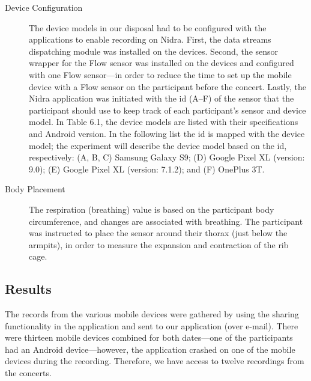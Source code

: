 \begin{description}
    \item[Device Configuration] The device models in our disposal had to be configured with the applications to enable recording on Nidra. First, the data streams dispatching module was installed on the devices. Second, the sensor wrapper for the Flow sensor was installed on the devices and configured with one Flow sensor---in order to reduce the time to set up the mobile device with a Flow sensor on the participant before the concert. Lastly, the Nidra application was initiated with the id (A--F) of the sensor that the participant should use to keep track of each participant's sensor and device model. In Table 6.1, the device models are listed with their specifications and Android version. In the following list the id is mapped with the device model; the experiment will describe the device model based on the id, respectively: (A, B, C) Samsung Galaxy S9; (D) Google Pixel XL (version: 9.0); (E) Google Pixel XL (version: 7.1.2); and (F) OnePlus 3T. 
    \item[Body Placement] The respiration (breathing) value is based on the participant body circumference, and changes are associated with breathing. The participant was instructed to place the sensor around their thorax (just below the armpits), in order to measure the expansion and contraction of the rib cage.

\end{description}

\subsection{Results}

The records from the various mobile devices were gathered by using the sharing functionality in the application and sent to our application (over e-mail). There were thirteen mobile devices combined for both dates---one of the participants had an Android device---however, the application crashed on one of the mobile devices during the recording. Therefore, we have access to twelve recordings from the concerts. 

